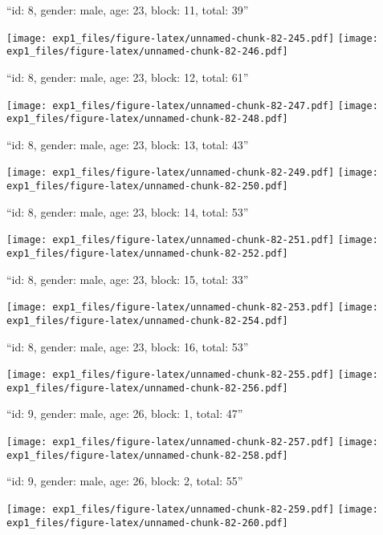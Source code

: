 \documentclass[11pt,,]{article}
\begin{document}
\newpage
[1] 

``id: 8, gender: male, age: 23, block: 11, total: 39''

\texttt{[image: exp1\_files/figure-latex/unnamed-chunk-82-245.pdf]}
\texttt{[image: exp1\_files/figure-latex/unnamed-chunk-82-246.pdf]}

\newpage
[1] 

``id: 8, gender: male, age: 23, block: 12, total: 61''

\texttt{[image: exp1\_files/figure-latex/unnamed-chunk-82-247.pdf]}
\texttt{[image: exp1\_files/figure-latex/unnamed-chunk-82-248.pdf]}

\newpage
[1] 

``id: 8, gender: male, age: 23, block: 13, total: 43''

\texttt{[image: exp1\_files/figure-latex/unnamed-chunk-82-249.pdf]}
\texttt{[image: exp1\_files/figure-latex/unnamed-chunk-82-250.pdf]}

\newpage
[1] 

``id: 8, gender: male, age: 23, block: 14, total: 53''

\texttt{[image: exp1\_files/figure-latex/unnamed-chunk-82-251.pdf]}
\texttt{[image: exp1\_files/figure-latex/unnamed-chunk-82-252.pdf]}

\newpage
[1] 

``id: 8, gender: male, age: 23, block: 15, total: 33''

\texttt{[image: exp1\_files/figure-latex/unnamed-chunk-82-253.pdf]}
\texttt{[image: exp1\_files/figure-latex/unnamed-chunk-82-254.pdf]}

\newpage
[1] 

``id: 8, gender: male, age: 23, block: 16, total: 53''

\texttt{[image: exp1\_files/figure-latex/unnamed-chunk-82-255.pdf]}
\texttt{[image: exp1\_files/figure-latex/unnamed-chunk-82-256.pdf]}

\newpage
[1] 

``id: 9, gender: male, age: 26, block: 1, total: 47''

\texttt{[image: exp1\_files/figure-latex/unnamed-chunk-82-257.pdf]}
\texttt{[image: exp1\_files/figure-latex/unnamed-chunk-82-258.pdf]}

\newpage
[1] 

``id: 9, gender: male, age: 26, block: 2, total: 55''

\texttt{[image: exp1\_files/figure-latex/unnamed-chunk-82-259.pdf]}
\texttt{[image: exp1\_files/figure-latex/unnamed-chunk-82-260.pdf]}
\end{document}
